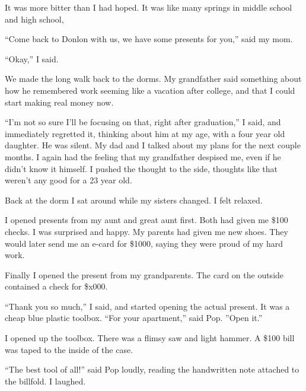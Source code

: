It was more bitter than I had hoped.  It was like many springs in middle school
and high school, 

``Come back to Donlon with us, we have some presents for you,'' said my mom. 

``Okay,'' I said.  

We made the long walk back to the dorms.  My grandfather said something about
how he remembered work seeming like a vacation after college, and that I could
start making real money now.

``I'm not so sure I'll be focusing on that, right after graduation,'' I said,
and immediately regretted it, thinking about him at my age, with a four year old
daughter.  He was silent.  My dad and I talked about my plans for the next
couple months.  I again had the feeling that my grandfather despised me, even if
he didn't know it himself.  I pushed the thought to the side, thoughts like that
weren't any good for a 23 year old.

Back at the dorm I sat around while my sisters changed.  I felt relaxed.

I opened presents from my aunt and great aunt first.  Both had given me \$100
checks.  I was surprised and happy.  My parents had given me new shoes.  They
would later send me an e-card for \$1000, saying they were proud of my hard
work.  

Finally I opened the present from my grandparents.  The card on the outside
contained a check for \$x000.  

``Thank you so much,'' I said, and started opening the actual present.  It was a
cheap blue plastic toolbox.  ``For your apartment,'' said Pop.  ''Open it.''

I opened up the toolbox.  There was a flimsy saw and light hammer.  A \$100 bill
was taped to the inside of the case.

``The best tool of all!'' said Pop loudly, reading the handwritten note attached
to the billfold.  I laughed.
